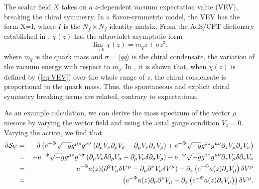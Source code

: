 The scalar field $X$ takes on a $z$-dependent vacuum expectation value (VEV), breaking the chiral symmetry. 
In a flavor-symmetric model, the VEV has the form 
\be
\langle X\rangle=I,
\ee
 where $I$ is the $N_{f}\times N_{f}$ identity matrix. 
From the AdS/CFT dictionary established in \cite{maldacena,klebanov-witten}, $\chi(z)$
has the ultraviolet asymptotic form
\begin{equation}
\lim_{z\rightarrow0}\chi(z)=m_{q}z+\sigma z^{3},\label{eq:VEV}
\end{equation}
where $m_{q}$ is the quark mass and $\sigma=\langle\bar{q}q\rangle$ is the chiral condensate, the variation of the vacuum energy with respect to $m_{q}$. 
In \cite{karch-katz-son-adsqcd}, it is shown that, when $\chi(z)$ is defined by (\ref{eq:VEV}) over the whole range of $z$, the chiral condensate is proportional to the quark mass.
Thus, the spontaneous and explicit chiral symmetry breaking terms are related, contrary to expectations.

As an example calculation, we can derive the mass spectrum of the vector $\rho$ mesons by varying the vector field and using the axial gauge condition $V_{z}=0.$ 
Varying the action, we find that 
\begin{eqnarray}
\delta \mathcal{S}_{V} &=& -\delta\left({\rm e}^{-\Phi}\sqrt{-g}g^{\mu\rho}g^{\nu\sigma}\left(\partial_{\mu}V_{\nu}\partial_{\rho}V_{\sigma} - \partial_{\mu}V_{\nu}\partial_{\sigma}V_{\rho}\right)+{\rm e}^{-\Phi}\sqrt{-g}g^{zz}g^{\mu\nu}\partial_{z}V_{\mu}\partial_{z}V_{\nu}\right) \nonumber\\
&=& -{\rm e}^{-\Phi}\sqrt{-g}g^{\mu\rho}g^{\nu\sigma}\left(\partial_{\mu}V_{\nu}\delta\partial_{\rho}V_{\sigma} - \partial_{\mu}V_{\nu}\delta\partial_{\sigma}V_{\rho}\right) - {\rm e}^{-\Phi}\sqrt{-g}g^{zz}g^{\mu\nu}\partial_{z}V_{\mu}\delta\partial_{z}V_{\nu}\nonumber\\
&=& {\rm e}^{-\Phi}a(z) (\partial^{2}V_{\mu}\delta V^{\mu} - \partial_{\mu}\partial^{\nu}V_{\nu}\delta V^{\mu}) + \partial_{z}\left({\rm e}^{-\Phi} a(z)\partial_{z} V_{\mu}\right)\delta V^{\mu}\nonumber\\
&=& \left({\rm e}^{-\Phi} a(z) \partial_{\nu}\partial^{\nu}V_{\mu} + \partial_{z}\left({\rm e}^{-\Phi} a(z)\partial_{z} V_{\mu}\right)\right)\delta V^{\mu},\label{equVectorstep}
\end{eqnarray}
 
